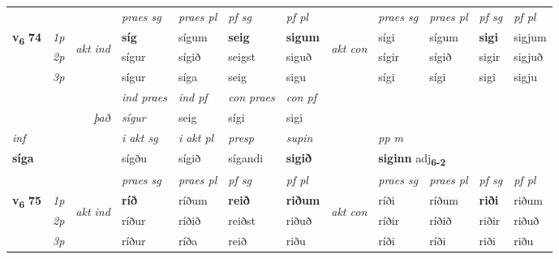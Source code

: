 \begin{longtable}[l]{X>{\footnotesize\itshape}llXXXXlXXXX}
 & &   & \textit{praes sg}  & \textit{praes pl}    & \textit{ pf sg} & \textit{pf pl} & & \textit{praes sg}  & \textit{praes pl}    & \textit{pf sg} & \textit{pf pl }  \\ \cmidrule{4-7} \cmidrule{9-12}
 \multirow{2}{*}{{{\textbf{v{\textsubscript{6}}} \Large{\textbf{74}}}}}  & 1p & \multirow{3}{*}{\begin{turn}{90}\textit{akt ind}\end{turn}} & \textbf{síg} & sígum & \textbf{seig} & \textbf{sigum} & \multirow{3}{*}{\begin{turn}{90}\textit{akt con}\end{turn}} &sígi & sígum & \textbf{sigi} & sigjum\\*
 & 2p &  &  sígur  & sígið & seigst & siguð & & sígir & sígið & sigir & sigjuð \\*
 & 3p &  & sígur & síga & seig & sigu & & sígi & sígi& sigi & sigju \\*
\cmidrule{4-7} \cmidrule{9-12}

   && &  \textit{ind praes} & \textit{ind pf} & \textit{con praes} & \textit{con pf} \\*
\multicolumn{3}{r}{\textit{það}} & sígur & seig & sígi & sigi \\*

\cmidrule{4-7}
   {\textit{inf}} & &  & \textit{i akt sg} & \textit{i akt pl}   & \textit{presp} & \textit{supin}  && \textit{pp m} \\*
  {\textbf{síga}} & && sígðu  & sígið   & sígandi &  \textbf{sigið}  && \multicolumn{2}{l}{\textbf{siginn} adj\textbf{\textsubscript{6-2}}} \\*

\midrule

 & &   & \textit{praes sg}  & \textit{praes pl}    & \textit{ pf sg} & \textit{pf pl} & & \textit{praes sg}  & \textit{praes pl}    & \textit{pf sg} & \textit{pf pl }  \\ \cmidrule{4-7} \cmidrule{9-12}
 \multirow{2}{*}{{{\textbf{v{\textsubscript{6}}} \Large{\textbf{75}}}}}  & 1p & \multirow{3}{*}{\begin{turn}{90}\textit{akt ind}\end{turn}} & \textbf{ríð} & ríðum & \textbf{reið} & \textbf{riðum} & \multirow{3}{*}{\begin{turn}{90}\textit{akt con}\end{turn}} &ríði & ríðum & \textbf{riði} & riðum\\*
 & 2p &  &  ríður  & ríðið & reiðst & riðuð & & ríðir & ríðið & riðir & riðuð \\*
 & 3p &  & ríður & ríða & reið & riðu & & ríði & ríði& riði & riðu \\*
\cmidrule{4-7} \cmidrule{9-12}


\end{longtable}
